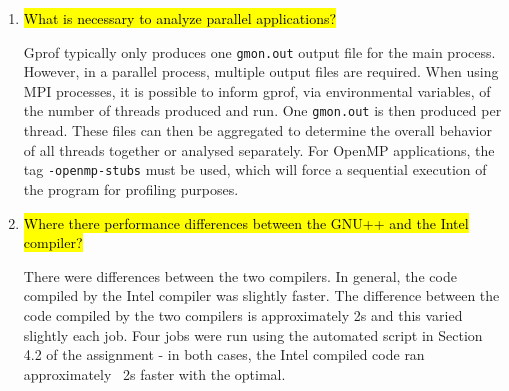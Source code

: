 \documentclass{article}
\begin{document}
\begin{enumerate}
	\item \hl{What is necessary to analyze parallel applications?}

	Gprof typically only produces one \verb!gmon.out! output file for the main process. However, in a parallel process, multiple output files are required. When using MPI processes, it is possible to inform gprof, via environmental variables, of the number of threads produced and run. One \verb!gmon.out! is then produced per thread. These files can then be aggregated to determine the overall behavior of all threads together or analysed separately. For OpenMP applications, the tag \verb!-openmp-stubs! must be used, which will force a sequential execution of the program for profiling purposes.

	\item \hl{Where there performance differences between the GNU++ and the Intel compiler?}

	There were differences between the two compilers. In general, the code compiled by the Intel compiler was slightly faster. The difference between the code compiled by the two compilers is approximately 2s and this varied slightly each job. Four jobs were run using the automated script in Section 4.2 of the assignment - in both cases, the Intel compiled code ran approximately ~2s faster with the optimal.
\end{enumerate}
\end{document}
